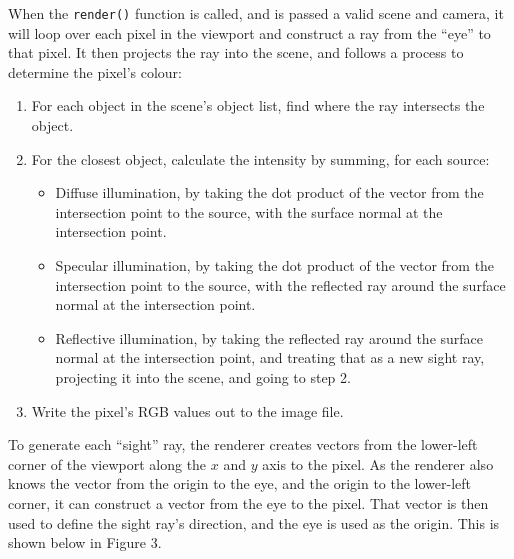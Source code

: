 \documentclass[a4paper]{article}
\begin{document}
When the \verb|render()| function is called, and is passed a valid scene and camera, it will loop over each pixel in the viewport and construct a ray from the ``eye'' to that pixel. It then projects the ray into the scene, and follows a process to determine the pixel's colour:
\begin{enumerate}
  \item For each object in the scene's object list, find where the ray intersects the object.
  \item For the closest object, calculate the intensity by summing, for each source:
  \begin{itemize}
    \item Diffuse illumination, by taking the dot product of the vector from the intersection point to the source, with the surface normal at the intersection point.
    \item Specular illumination, by taking the dot product of the vector from the intersection point to the source, with the reflected ray around the surface normal at the intersection point.
    \item Reflective illumination, by taking the reflected ray around the surface normal at the intersection point, and treating that as a new sight ray, projecting it into the scene, and going to step 2.
  \end{itemize}
  \item Write the pixel's RGB values out to the image file.
\end{enumerate}
To generate each ``sight'' ray, the renderer creates vectors from the lower-left corner of the viewport along the $x$ and $y$ axis to the pixel. As the renderer also knows the vector from the origin to the eye, and the origin to the lower-left corner, it can construct a vector from the eye to the pixel. That vector is then used to define the sight ray's direction, and the eye is used as the origin. This is shown below in Figure 3.
\end{document}
